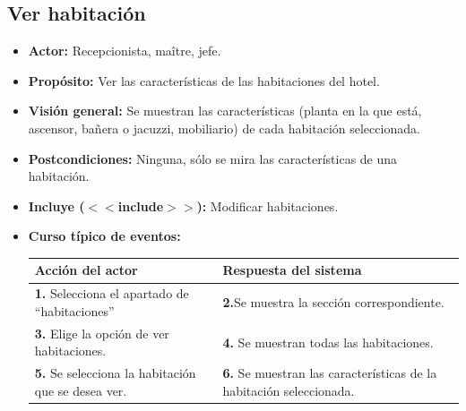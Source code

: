 \documentclass[spanish,a4paper,11pt, twoside]{report}	%
\begin{document}
	\subsection{Ver habitación}
		\begin{itemize}
			\item \textbf{Actor:} Recepcionista, maître, jefe.
			\item \textbf{Propósito: } Ver las características de las habitaciones del hotel.
			\item \textbf{Visión general:} Se muestran las características (planta en la que
					está, ascensor, bañera o jacuzzi, mobiliario) de cada habitación seleccionada.
			\item \textbf{Postcondiciones:} Ninguna, sólo se mira las características de una habitación.
			\item \textbf{Incluye ($<<$include$>>$):} Modificar habitaciones.
			\item \textbf{Curso típico de eventos:} 	\\
				\begin{tabular}{|p{6cm}||p{6cm}|}
				\hline
				\textbf{Acción del actor} & \textbf{Respuesta del sistema} \\ \hline
				\textbf{1.} Selecciona el apartado de ``habitaciones'' & 
				\textbf{2.}Se muestra la sección correspondiente.\\ \hline 
				\textbf{3.} Elige la opción de ver habitaciones. & 
				\textbf{4.} Se muestran todas las habitaciones.  \\ \hline
				\textbf{5.} Se selecciona la habitación que se desea ver. & 
				\textbf{6.} Se muestran las características de la habitación seleccionada. \\ \hline
			\end{tabular}
			\\
		\end {itemize}
		
\end{document}
